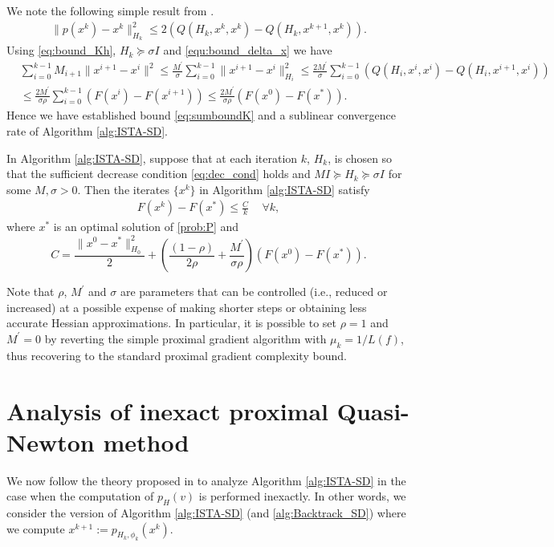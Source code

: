 \documentclass[11pt]{article}
\numberwithin{equation}{section}
\begin{document}
We note the following simple result from \cite{Saundersetal}.
\begin{align}
    \label{equ:bound_delta_x}
    \| p(x^k)-x^k \|_{H_k}^2 \leq 2 (Q(H_k,  x^{k}, x^k) - Q(H_k,  x^{k+1}, x^k)).
\end{align}
Using  \eqref{eq:bound_Kh},  $H_k\succeq \sigma I$  and \eqref{equ:bound_delta_x} we have 
\begin{eqnarray}\label{eq:x2_bound_exact}
    &\sum_{i=0}^{k-1}M_{i+1}\|x^{i+1}-x^i\|^2  \leq \frac{ M^\prime }{\sigma} \sum_{i=0}^{k-1}\|x^{i+1}-x^i\|_{H_i}^2\leq \frac{ 2M^\prime }{\sigma} \sum_{i=0}^{k-1} (Q(H_i, x^{i}, x^i) - Q(H_i, x^{i+1}, x^i))\nonumber \\
    & \leq \frac{2M^\prime  }{\sigma \rho}  \sum_{i=0}^{k-1}( F(x^i) - F(x^{i+1})) \leq \frac{2M^\prime  }{\sigma \rho} (F(x^0)-F(x^*)).
\end{eqnarray}
Hence we have established  bound \eqref{eq:sumboundK} and a sublinear convergence rate of  Algorithm \ref{alg:ISTA-SD}.
\begin{corollary}\label{the:ISTA-SD-cor}
In Algorithm \ref{alg:ISTA-SD}, suppose that at each iteration $k$,  $H_k$, is chosen so that the sufficient decrease condition \eqref{eq:dec_cond} holds and $MI\succeq H_k\succeq \sigma I$ for some $M, \sigma>0$.
Then the iterates $\{x^k\}$ in Algorithm \ref{alg:ISTA-SD} satisfy
\begin{align}\label{the:ISTA-final-bound} 
F(x^k)-F(x^*)\leq \frac {C}{k}\, \quad\forall k, \end{align}
where $x^*$ is an optimal solution of \eqref{prob:P} and 
\[
C=\frac{\|x^0-x^*\|_{H_0}^2}{2}+\left (\frac{(1-\rho)}{2\rho}+\frac{M^\prime }{\sigma \rho} \right )(F(x^0)-F(x^*)).
\]
\end{corollary}

Note that $\rho$, $M^\prime $ and $\sigma$ are parameters that can be controlled (i.e.,   reduced  or increased) at a possible expense of making shorter steps or obtaining less accurate Hessian approximations. In particular, it is possible to set $\rho=1$ and $M^\prime =0$ by reverting the simple proximal gradient algorithm with $\mu_k=1/{L(f)}$, thus recovering to the standard proximal gradient complexity bound. 
\section{Analysis of inexact proximal Quasi-Newton method} %
\label{sec:conv_inexact}

We now follow the theory proposed in  \cite{Schmidtetal} to analyze Algorithm \ref{alg:ISTA-SD}  in the case when the computation of $p_H( v)$ is performed inexactly. 
In other words, we consider the version of Algorithm \ref{alg:ISTA-SD} (and \ref{alg:Backtrack_SD}) where we compute 
$x^{k+1}  := p_{H_k, \phi_k}(x^k)$.
\end{document}
